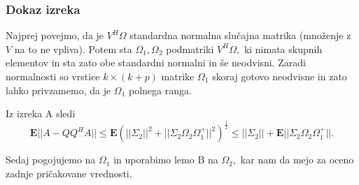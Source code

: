 \documentclass{beamer}
\begin{document}
\begin{frame}
\frametitle{Dokaz izreka}

Najprej povejmo, da je $V^H \Omega$ standardna normalna slučajna matrika (množenje z $V$ na to ne vpliva). Potem sta $\Omega_1, \Omega_2$ podmatriki $V^H\Omega,$ ki nimata skupnih elementov in sta zato obe standardni normalni in še neodvisni. Zaradi normalnosti so vrstice $k \times (k+p)$ matrike $\Omega_1$ skoraj gotovo neodvisne in zato lahko privzamemo, da je $\Omega_1$ polnega ranga.

Iz izreka A sledi $$\textbf{E}|| A - QQ^HA|| \leq \textbf{E}(|| \Sigma_2||^2 + ||\Sigma_2 \Omega_2 \Omega_1^+||^2)^{\frac{1}{2}} \leq ||\Sigma_2|| +  \textbf{E}|| \Sigma_2 \Omega_2 \Omega_1^+||.$$

Sedaj pogojujemo na $\Omega_1$ in uporabimo lemo B na $\Omega_2,$ kar nam da mejo za oceno zadnje pričakovane vrednosti.

\end{frame}
\end{document}
